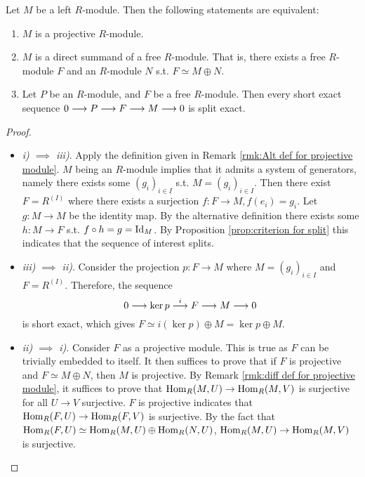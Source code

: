 \begin{proposition}\label{prop:criterion for projective module}
    Let $M$ be a left $R$-module. Then the following statements are equivalent:
    \begin{enumerate}[label=\roman*)]
        \item $M$ is a projective $R$-module.
        \item $M$ is a direct summand of a free $R$-module. That is, there exists a free $R$-module $F$ and an $R$-module $N$ s.t. $F \simeq M \oplus N$.
        \item Let $P$ be an $R$-module, and $F$ be a free $R$-module. Then every short exact sequence $0 \longrightarrow P \longrightarrow F \longrightarrow M \longrightarrow 0$ is split exact.
    \end{enumerate}
\end{proposition}

\begin{proof}\ 
    \begin{itemize}
        \item \emph{i) $\implies$ iii)}. Apply the definition given in Remark \ref{rmk:Alt def for projective module}. $M$ being an $R$-module implies that it admits a system of generators, namely there exists some $(g_i)_{i\in I}$ s.t. $M = (g_i)_{i\in I}$. Then there exist $F = R^{(I)}$ where there exists a surjection $f: F \to M, f(e_i) = g_i$. Let $g: M \to M$ be the identity map. By the alternative definition there exists some $h: M \to F$ s.t. $f \circ h = g = \mathrm{Id}_M$. By Proposition \ref{prop:criterion for split} this indicates that the sequence of interest splits.
        \item \emph{iii) $\implies$ ii)}. Consider the projection $p: F \to M$ where $M = (g_i)_{i\in I}$ and $F = R^{(I)}$. Therefore, the sequence
        \[
            0 \longrightarrow \ker p \overset{i}{\longrightarrow} F \longrightarrow M \longrightarrow 0
        \]
        is short exact, which gives $F \simeq i(\ker p) \oplus M = \ker p \oplus M$.
        \item \emph{ii) $\implies$ i)}. Consider $F$ as a projective module. This is true as $F$ can be trivially embedded to itself. It then suffices to prove that if $F$ is projective and $F \simeq M \oplus N$, then $M$ is projective. By Remark \ref{rmk:diff def for projective module}, it suffices to prove that $\mathrm{Hom}_R(M, U) \to \mathrm{Hom}_R(M, V)$ is surjective for all $U \to V$ surjective. $F$ is projective indicates that $\mathrm{Hom}_R(F, U) \to \mathrm{Hom}_R(F, V)$ is surjective. By the fact that $\mathrm{Hom}_R(F, U) \simeq \mathrm{Hom}_R(M, U) \oplus \mathrm{Hom}_R(N, U)$, $\mathrm{Hom}_R(M, U) \to \mathrm{Hom}_R(M, V)$ is surjective.
    \end{itemize}
\end{proof}

